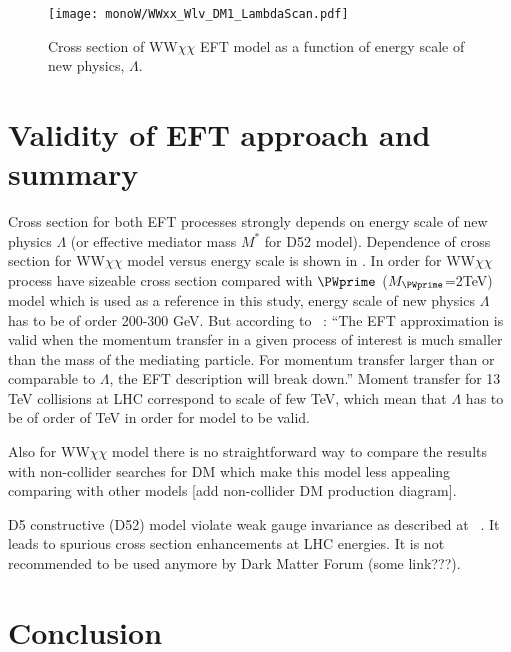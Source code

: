 \begin{figure}[hb]
 \texttt{[image: monoW/WWxx\_Wlv\_DM1\_LambdaScan.pdf]}
  \caption{Cross section of WW$\chi\chi$ EFT model as a function of energy scale of new physics, $\Lambda$.}
  \label{fig:lambdaScan}
\end{figure}

\section{Validity of EFT approach and summary}

Cross section for both EFT processes strongly depends on energy scale of new physics $\Lambda$ (or effective mediator mass $M^{*}$ for D52 model).
Dependence of cross section for WW$\chi\chi$ model versus energy scale is shown in .
In order for WW$\chi\chi$ process have sizeable cross section compared with $\PWprime$ ($M_{\PWprime}$=2TeV) model which is used as a reference in this study, 
energy scale of new physics $\Lambda$ has to be of order 200-300 GeV. But according to ~\cite{arXiv:1512.00476}: 
``The EFT approximation is valid when the momentum transfer in a given
process of interest is much smaller than the mass of the mediating
particle. For momentum transfer larger than or comparable to
$\Lambda$, the EFT description will break down.''
Moment transfer for 13 TeV collisions at LHC correspond to scale of few TeV, 
which mean that $\Lambda$ has to be of order of TeV in order for model to be valid.

Also for WW$\chi\chi$ model there is no straightforward way to compare the
results with non-collider searches for DM
which make this model less appealing comparing with other models [add non-collider DM production diagram].

D5 constructive (D52) model violate weak gauge invariance as described at ~\cite{arXiv:1503.07874}.
It leads to spurious cross section enhancements at LHC energies. It is not recommended to be used anymore by Dark Matter Forum (some link???).

\section{Conclusion}

